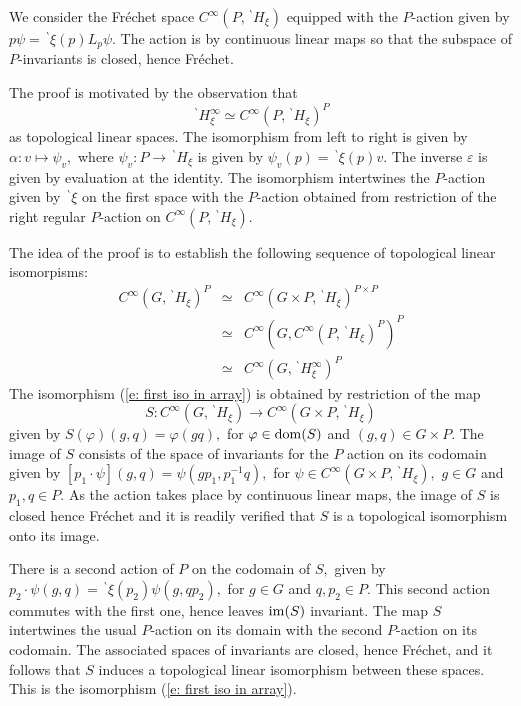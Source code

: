\documentclass[12pt,a4paper]{article}
\def\proof{\par\noindent{\it Proof.}{\ }{\ }}
\def\ga{\alpha}
\def\ge{\varepsilon}
\def\gf{\varphi}
\def\to{\rightarrow}
\numberwithin{Thm}{section}
\numberwithin{equation}{section}
\numberwithin{equation}{section}
\def\bp{\!{\,}^\backprime}
\begin{document}
\proof
We consider the Fr\'echet space $C^\infty(P, \bp H_\xi)$ equipped with the
$P$-action given by $p\psi = \bp\xi(p) L_p \psi.$ The action is by continuous linear maps
so that the subspace of $P$-invariants is closed, hence Fr\'echet.

The proof is motivated by the observation that
\begin{equation} 
\label{e: motivating iso}
\bp H_\xi^\infty \simeq C^\infty(P, \bp H_\xi)^P
\end{equation} 
as topological linear spaces. The isomorphism from left to
right is given by $\ga: v \mapsto \psi_v,$ where $\psi_v: P \to \bp H_\xi$ 
is given by $\psi_v(p) = \bp \xi(p) v.$ The inverse $\ge$ is given 
by evaluation at the identity.
The isomorphism intertwines the $P$-action given by $\bp \xi$ on the first space
with the $P$-action obtained from restriction of the right regular $P$-action on 
$C^\infty(P, \bp H_\xi).$ 

The idea of the proof is to establish the following sequence of 
topological linear isomorpisms:
\begin{eqnarray}
\label{e: first iso in array}
C^\infty(G, \bp H_\xi)^P & \simeq & C^\infty(G\times P, \bp H_\xi)^{P\times P} \\
\label{e: second iso in array}
& \simeq & C^\infty(G, C^\infty(P, \bp H_\xi)^P)^P\\
\label{e: third iso in array}
& \simeq &  C^\infty(G, \bp H_\xi^\infty)^{P}
\end{eqnarray}
The isomorphism (\ref{e: first iso in array}) is obtained by restriction of 
the map 
$$
S: C^\infty(G, \bp H_\xi) \to C^\infty(G\times P, \bp H_\xi)
$$%
given by  $S(\gf)(g, q ) = \gf (g q ),$ for $\gf \in  {\rm dom}(S)$ and $(g,q)\in G \times P.$ 
The image of $S$ consists of the space of invariants
for the $P$ action on its codomain given by $[p_1 \cdot \psi](g, q) = \psi(gp_1, p^{-1}_1 q),$ 
for $\psi \in C^\infty(G\times P, \bp H_\xi), $ $ g \in G$ and $p_1,q \in P.$ As the action takes
place by continuous linear maps, the image of $S$ is closed hence Fr\'echet 
and it is readily verified that $S$ is a topological isomorphism onto its image.

There is a second action of $P$ on the codomain of $S,$ given by 
$p_2 \cdot \psi(g,q) = \bp\xi(p_2)\psi(g, q p_2),$ for $g \in G$ and $q, p_2 \in P.$ 
This second action commutes with the first one, hence leaves ${\rm im}(S)$ invariant.
The map $S$ intertwines the usual $P$-action on its domain with 
the second $P$-action on its codomain. The associated spaces of invariants
are closed, hence Fr\'echet, and it follows that $S$ induces a topological linear
isomorphism between these spaces. This is the isomorphism (\ref{e: first iso in array}).
\end{document}
